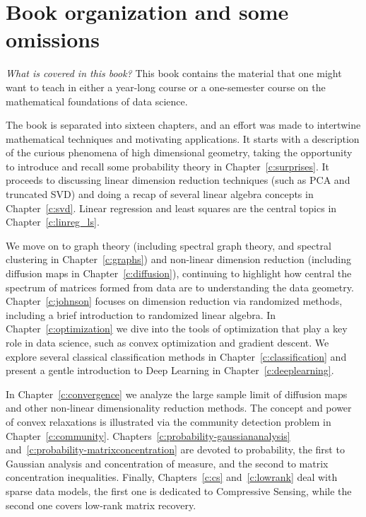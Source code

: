 \section{Book organization and some omissions}

\emph{What is covered in this book?}
This book contains the material that one might want to teach in either a year-long course or a one-semester course on the mathematical foundations of data science.

The book is separated into  sixteen chapters, and an effort was made to intertwine mathematical techniques and motivating applications. It starts with a description of the curious phenomena of high dimensional geometry, taking the opportunity to introduce and recall some probability theory in Chapter~\ref{c:surprises}. It proceeds to discussing linear dimension reduction techniques (such as PCA and truncated SVD) and doing a recap of several linear algebra concepts in Chapter~\ref{c:svd}. Linear regression and least squares are the central topics in Chapter~\ref{c:linreg_ls}.

We move on to graph theory (including spectral graph theory, and spectral clustering in Chapter~\ref{c:graphs}) and non-linear dimension reduction (including diffusion maps in Chapter~\ref{c:diffusion}), continuing to highlight how central the spectrum of matrices formed from data are to understanding the data geometry. 
Chapter~\ref{c:johnson} focuses on dimension reduction via randomized methods, including a brief introduction to randomized linear algebra. In Chapter~\ref{c:optimization} we dive into the tools of optimization that play a key role in data science, such as convex optimization and gradient descent.
We explore several classical classification methods in Chapter~\ref{c:classification} and present a gentle introduction to Deep Learning in Chapter~\ref{c:deeplearning}.

In Chapter~\ref{c:convergence} we analyze the large sample limit 
of diffusion maps and other non-linear dimensionality reduction methods.
The concept and power of convex relaxations is illustrated via the community detection problem in Chapter~\ref{c:community}. 
Chapters~\ref{c:probability-gaussiananalysis} and~\ref{c:probability-matrixconcentration} are devoted to probability, the first to Gaussian analysis and concentration of measure, and the second to matrix concentration inequalities. 
Finally, Chapters~\ref{c:cs} and~\ref{c:lowrank} deal with sparse data models, the first one is dedicated to Compressive Sensing, while the second one covers low-rank matrix recovery.


